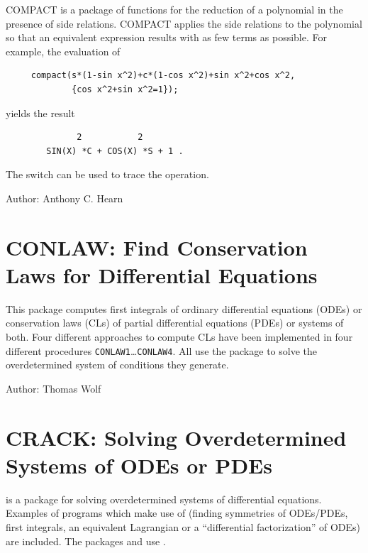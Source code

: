 COMPACT is a package of functions for the reduction of a polynomial in the
presence of side relations.  COMPACT applies the side relations to the
polynomial so that an equivalent expression results with as few terms as
possible.  For example, the evaluation of
\begin{verbatim}
     compact(s*(1-sin x^2)+c*(1-cos x^2)+sin x^2+cos x^2,
             {cos x^2+sin x^2=1});
\end{verbatim}
yields the result\pagebreak[1]
\begin{verbatim}
              2           2
        SIN(X) *C + COS(X) *S + 1 .
\end{verbatim}
The switch  can be used to trace the operation.

Author: Anthony C. Hearn
\fi

\section{CONLAW: Find Conservation Laws for Differential Equations}
\label{package:CONLAW}

This package computes first integrals of ordinary differential
equations (ODEs) or conservation laws (CLs) of partial differential
equations (PDEs) or systems of both.  Four different approaches to
compute CLs have been implemented in four different procedures
\texttt{CONLAW1}\ldots \texttt{CONLAW4}.  All use the package
\hyperref[package:CRACK]{} to solve the overdetermined
system of conditions they generate.

Author: Thomas Wolf



\newpage

\section{CRACK: Solving Overdetermined Systems of ODEs or PDEs}
\label{package:CRACK}

 is a package for solving overdetermined systems of
differential equations.  Examples of programs which make use of
 (finding symmetries of ODEs/PDEs, first integrals, an
equivalent Lagrangian or a ``differential factorization'' of ODEs) are
included.  The packages
\hyperref[package:APPLYSYM]{} and
\hyperref[package:CONLAW]{} use .

